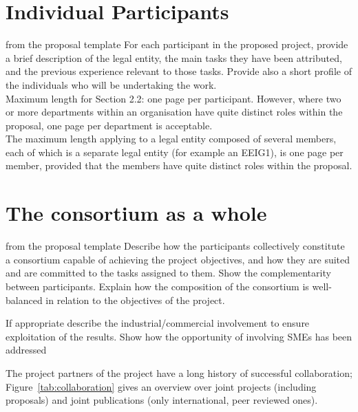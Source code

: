 \section{Individual Participants}\label{sec:partners}
\begin{todo}{from the proposal template}
For each participant in the proposed project, provide a brief description of the legal entity, the main
tasks they have been attributed, and the previous experience relevant to those tasks. Provide also a
short profile of the individuals who will be undertaking the work.\\
Maximum length for Section 2.2: one page per participant. However, where two or more departments within
an organisation have quite distinct roles within the proposal, one page per department is acceptable.\\
The maximum length applying to a legal entity composed of several members, each of which is a separate
legal entity (for example an EEIG1), is one page per member, provided that the members have quite distinct
roles within the proposal.
\end{todo}
\newpage
\newpage
\newpage
\newpage
\newpage

\section{The {\protect\pn} consortium as a whole}
\begin{todo}{from the proposal template}
  Describe how the participants collectively constitute a consortium capable of achieving
  the project objectives, and how they are suited and are committed to the tasks assigned
  to them. Show the complementarity between participants. Explain how the composition of
  the consortium is well-balanced in relation to the objectives of the project.  

  If appropriate describe the industrial/commercial involvement to ensure exploitation of
  the results. Show how the opportunity of involving SMEs has been addressed
\end{todo}

The project partners of the \pn project have a long history of successful collaboration;
Figure~\ref{tab:collaboration} gives an overview over joint projects (including proposals) and
joint publications (only international, peer reviewed ones).

\coherencetable

